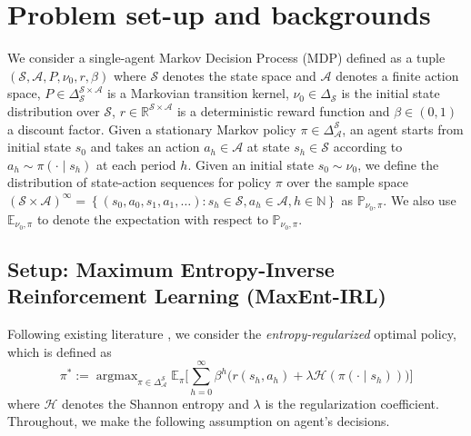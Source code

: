 
\section{Problem set-up and backgrounds}\label{sec:SetupBackgrounds}

We consider a single-agent Markov Decision Process (MDP) defined as a tuple $\left(\mathcal{S}, \mathcal{A}, P, \nu_0, r, \beta\right)$ where $\mathcal{S}$ denotes the state space and $\mathcal{A}$ denotes a finite action space, $P \in \Delta_{\mathcal{S}}^{\mathcal{S} \times \mathcal{A}}$ is a Markovian transition kernel, $\nu_0 \in \Delta_{\mathcal{S}}$ is the initial state distribution over $\mathcal{S}$,  $r \in \mathbb{R}^{\mathcal{S} \times \mathcal{A}}$ is a deterministic reward function and $\beta \in(0,1)$ a discount factor.  
Given a stationary Markov policy $\pi \in \Delta_{\mathcal{A}}^{\mathcal{S}}$, an agent starts from initial state $s_0$ and takes an action $a_h\in \mathcal{A}$ at state $s_h\in \mathcal{S}$ according to $a_h\sim\pi\left(\cdot \mid s_h\right)$ at each period $h$. Given an initial state $s_0\sim \nu_0$, we define the distribution of state-action sequences for policy $\pi$ over the sample space $(\mathcal{S} \times \mathcal{A})^{\infty}=\left\{\left(s_0, a_0, s_1, a_1, \ldots\right): s_h \in \mathcal{S}, a_h \in \mathcal{A}, h \in \mathbb{N}\right\}$ as $\mathbb{P}_{\nu_0,\pi}$. 
We also use $\mathbb{E}_{\nu_0,\pi}$ to denote the expectation with respect to $\mathbb{P}_{\nu_0,\pi}$.

\subsection{Setup: Maximum Entropy-Inverse Reinforcement Learning (MaxEnt-IRL) %
} 
\label{sec:IRLIntro}

 Following existing literature \citep{geng2020deep, fu2017learning, ho2016generative}, we consider the \textit{entropy-regularized} optimal policy, which is defined as
$$
\pi^*:=\operatorname{argmax}_{\pi \in \Delta_{\mathcal{A}}^{\mathcal{S}}}\mathbb{E}_\pi\bigl[\sum_{h=0}^{\infty} \beta^h \bigl(r(s_h, a_h)+\lambda\mathcal{H}(\pi(\cdot \mid s_h))\bigr)\bigr]
$$ 
where $\mathcal{H}$ denotes the Shannon entropy and $\lambda$ is the regularization coefficient. Throughout, we make the following assumption on agent's decisions.

